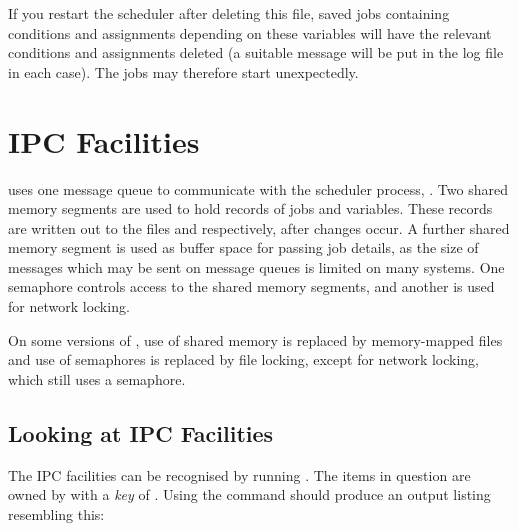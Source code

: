 If you restart the scheduler after deleting this file, saved jobs containing conditions and assignments depending on these variables will
have the relevant conditions and assignments deleted (a suitable message will be put in the log file in each case). The jobs may
therefore start unexpectedly.

\section{IPC Facilities}
\ProductName{} uses one message queue to communicate with the scheduler process, . Two shared memory segments are
used to hold records of jobs and variables. These records are written out to the files  and
 respectively, after changes occur. A further shared memory segment is used as buffer space for passing job
details, as the size of messages which may be sent on message queues is limited on many systems. One semaphore controls access to the shared memory segments, and another is used for network locking.

On some versions of \ProductName{}, use of shared memory is replaced by memory-mapped files and use of semaphores is
replaced by file locking, except for network locking, which still uses a semaphore.

\subsection{Looking at IPC Facilities}
The IPC facilities can be recognised by running . The items in question are owned by \batchuser{}
with a \textit{key} of . Using the command  should produce an output listing
resembling this:

